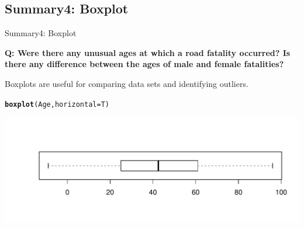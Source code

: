 \documentclass[t,xcolor=pdftex,dvipsnames,table]{beamer}
\makeatletter
\def\maxwidth{ %
  \ifdim\Gin@nat@width>\linewidth
    \linewidth
  \else
    \Gin@nat@width
  \fi
}
\newcommand{\hlstd}[1]{\textcolor[rgb]{0.345,0.345,0.345}{#1}}%
\newcommand{\hlkwc}[1]{\textcolor[rgb]{0.333,0.667,0.333}{#1}}%
\newcommand{\hlkwd}[1]{\textcolor[rgb]{0.737,0.353,0.396}{\textbf{#1}}}%
\newenvironment{kframe}{%
 \def\at@end@of@kframe{}%
 \ifinner\ifhmode%
  \def\at@end@of@kframe{\end{minipage}}%
  \begin{minipage}{\columnwidth}%
 \fi\fi%
 \def\FrameCommand##1{\hskip\@totalleftmargin \hskip-\fboxsep
 \colorbox{shadecolor}{##1}\hskip-\fboxsep
     \hskip-\linewidth \hskip-\@totalleftmargin \hskip\columnwidth}%
 \MakeFramed {\advance\hsize-\width
   \@totalleftmargin\z@ \linewidth\hsize
   \@setminipage}}%
 {\par\unskip\endMakeFramed%
 \at@end@of@kframe}
\newenvironment{knitrout}{}{} %
\makeatother
\begin{document}
\subsection[]{Summary4: Boxplot}
\begin{frame}[fragile]{Summary4: Boxplot}

\vspace{.5cm}
{\bf Q: Were there any unusual ages at which a road fatality occurred? Is there any difference between the ages of male and female fatalities?}

\vspace{.5cm}
Boxplots are useful for comparing data sets and identifying outliers. 

\begin{knitrout}
\color{fgcolor}\begin{kframe}
\begin{alltt}
\hlkwd{boxplot}\hlstd{(Age,}\hlkwc{horizontal}\hlstd{=T)}
\end{alltt}
\end{kframe}
\includegraphics[width=\maxwidth]{figure/unnamed-chunk-12-1} 

\end{knitrout}
 
\end{frame}
\end{document}
